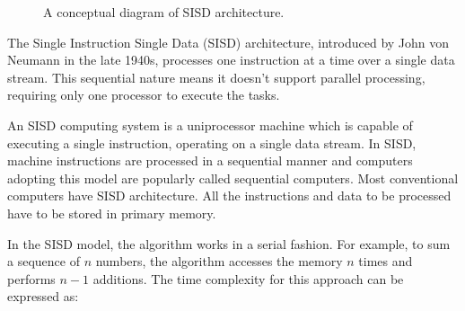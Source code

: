 \documentclass[a4paper, 10pt]{book}
\begin{document}
                \begin{wrapfigure}{r}{0.5\textwidth}

                    \centering


                    \caption{A conceptual diagram of SISD architecture.}

                \end{wrapfigure}

                The Single Instruction Single Data (SISD) architecture, introduced by John von Neumann in the late 1940s, processes one instruction at a time over a single data stream. This sequential nature means it doesn't support parallel processing, requiring only one processor to execute the tasks.

                An SISD computing system is a uniprocessor machine which is capable of executing a single instruction, operating on a single data stream. In SISD, machine instructions are processed in a sequential manner and computers adopting this model are popularly called sequential computers. Most conventional computers have SISD architecture. All the instructions and data to be processed have to be stored in primary memory.

                In the SISD model, the algorithm works in a serial fashion. For example, to sum a sequence of $n$ numbers, the algorithm accesses the memory $n$ times and performs $n−1$ additions. The time complexity for this approach can be expressed as:
        
\end{document}
